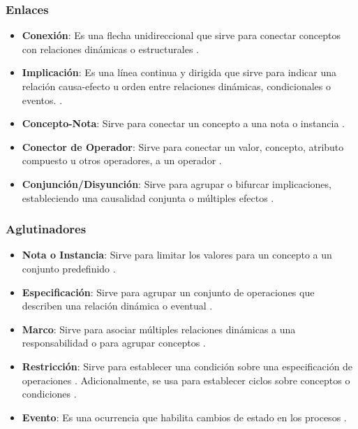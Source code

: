 \subsubsection{Enlaces}
\begin{itemize}
	\item \textbf{Conexión}: Es una flecha unidireccional que sirve para conectar conceptos con relaciones dinámicas o estructurales \citep{zapata2007phd,zapata2012unc}.
	\item \textbf{Implicación}: Es una línea continua y dirigida que sirve para indicar una relación causa-efecto u orden entre relaciones dinámicas, condicionales o eventos. \citep{zapata2007phd,zapata2012unc}. 
	\item \textbf{Concepto-Nota}: Sirve para conectar un concepto a una nota o instancia \citep{zapata2007phd,zapata2012unc}.
	\item \textbf{Conector de Operador}: Sirve para conectar un valor, concepto, atributo compuesto u otros operadores, a un operador \citep{zapata2012unc}. 
	\item \textbf{Conjunción/Disyunción}: Sirve para agrupar o bifurcar implicaciones, estableciendo una causalidad conjunta o múltiples efectos \citep{zapata2007phd,zapata2012unc}. 
\end{itemize}

\subsubsection{Aglutinadores}
\begin{itemize}
	\item \textbf{Nota o Instancia}: Sirve para limitar los valores para un concepto a un conjunto predefinido \citep{zapata2007phd,zapata2012unc}.
	\item \textbf{Especificación}: Sirve para agrupar un conjunto de operaciones que describen una relación dinámica o eventual \citep{zapata2012unc}.
	\item \textbf{Marco}: Sirve para asociar múltiples relaciones dinámicas a una responsabilidad o para agrupar conceptos \citep{zapata2012unc}.
	\item \textbf{Restricción}: Sirve para establecer una condición sobre una especificación de operaciones \citep{zapata2012unc}. Adicionalmente, se usa para establecer ciclos sobre conceptos o condiciones \citep{JChaverra}.
	\item \textbf{Evento}: Es una ocurrencia que habilita cambios de estado en los procesos  \citep{zapata2013Eventos}.
\end{itemize}

